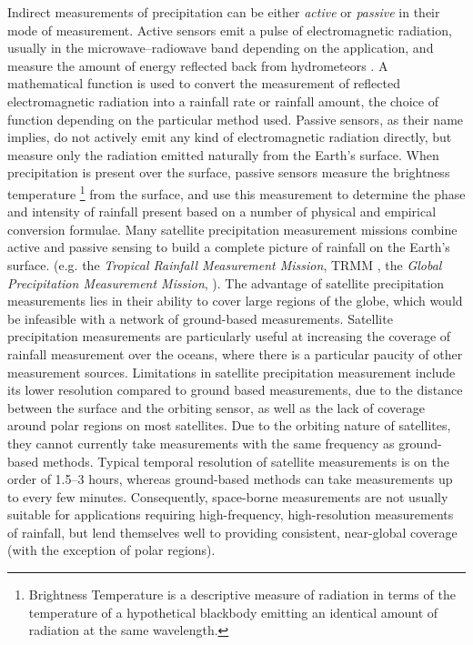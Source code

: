 Indirect measurements of precipitation can be either \textit{active} or \textit{passive} in their mode of measurement. Active sensors emit a pulse of electromagnetic radiation, usually in the microwave--radiowave band depending on the application, and measure the amount of energy reflected back from hydrometeors \citep{fabry2015radar}. A mathematical function is used to convert the measurement of reflected electromagnetic radiation into a rainfall rate or rainfall amount, the choice of function depending on the particular method used. Passive sensors, as their name implies, do not actively emit any kind of electromagnetic radiation directly, but measure only the radiation emitted naturally from the Earth's surface. When precipitation is present over the surface, passive sensors measure the brightness temperature \footnote{Brightness Temperature is a descriptive measure of radiation in terms of the temperature of a hypothetical blackbody emitting an identical amount of radiation at the same wavelength.} from the surface, and use this measurement to determine the phase and intensity of rainfall present based on a number of physical and empirical conversion formulae. Many satellite precipitation measurement missions combine active and passive sensing to build a complete picture of rainfall on the Earth's surface. (e.g. the \textit{Tropical Rainfall Measurement Mission}, TRMM \citet{simpson1988proposed}, the \textit{Global Precipitation Measurement Mission}, \citet{hou2014global}). The advantage of satellite precipitation measurements lies in their ability to cover large regions of the globe, which would be infeasible with a network of ground-based measurements. Satellite precipitation measurements are particularly useful at increasing the coverage of rainfall measurement over the oceans, where there is a particular paucity of other measurement sources. Limitations in satellite precipitation measurement include its lower resolution compared to ground based measurements, due to the distance between the surface and the orbiting sensor, as well as the lack of coverage around polar regions on most satellites. Due to the orbiting nature of satellites, they cannot currently take measurements with the same frequency as ground-based methods. Typical temporal resolution of satellite measurements is on the order of 1.5--3 hours, whereas ground-based methods can take measurements up to every few minutes. Consequently, space-borne measurements are not usually suitable for applications requiring high-frequency, high-resolution measurements of rainfall, but lend themselves well to providing consistent, near-global coverage (with the exception of polar regions). 

